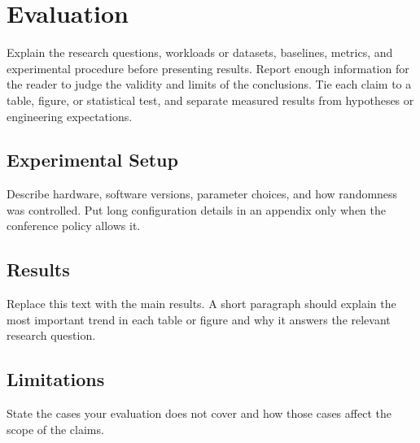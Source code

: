 \section{Evaluation}
\label{sec:evaluation}

Explain the research questions, workloads or datasets, baselines, metrics, and
experimental procedure before presenting results. Report enough information
for the reader to judge the validity and limits of the conclusions. Tie each
claim to a table, figure, or statistical test, and separate measured results
from hypotheses or engineering expectations.

\subsection{Experimental Setup}
Describe hardware, software versions, parameter choices, and how randomness
was controlled. Put long configuration details in an appendix only when the
conference policy allows it.

\subsection{Results}
Replace this text with the main results. A short paragraph should explain the
most important trend in each table or figure and why it answers the relevant
research question.

\subsection{Limitations}
State the cases your evaluation does not cover and how those cases affect the
scope of the claims.
